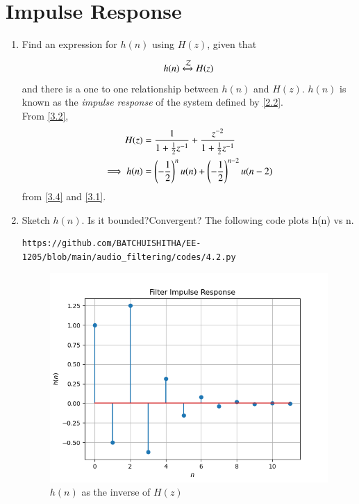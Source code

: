 \documentclass[journal,12pt,twocolumn]{IEEEtran}
\newcommand{\systemZ}[1]{\stackrel{#1}{\mathcal{Z}}}
\theoremstyle{remark}
\begin{document}
\section{Impulse Response}
\begin{enumerate}[label=\thesection.\arabic*]
\item \label{prob:impulse_resp}
Find an expression for $h(n)$ using $H(z)$, given that 
\begin{equation}
h(n) \xleftrightarrow{\systemZ{}} H(z)  \label{4.1}
\end{equation}
and there is a one to one relationship between $h(n)$ and $H(z)$. $h(n)$ is known as the {\em impulse response} of the
system defined by \eqref{2.2}.\\
\solution From \eqref{3.2},
\begin{align}
H(z) &= \frac{1}{1 + \frac{1}{2}z^{-1}} + \frac{ z^{-2}}{1 + \frac{1}{2}z^{-1}}
\\
\implies h(n) &= \left(-\frac{1}{2}\right)^{n}u(n) + \left(-\frac{1}{2}\right)^{n-2}u(n-2)
\end{align}
from \eqref{3.4} and \eqref{3.1}.
\item Sketch $h(n)$. Is it bounded?Convergent?
The following code plots h(n) vs n.
\begin{lstlisting}
https://github.com/BATCHUISHITHA/EE-1205/blob/main/audio_filtering/codes/4.2.py
\end{lstlisting}
\begin{figure}[ht]
	\centering
	\includegraphics[width=\columnwidth]{figs/4.2.png}
	\caption{$h(n)$ as the inverse of $H(z)$}
	\label{fig:4.2}
\end{figure}

\end{enumerate}
\end{document}
